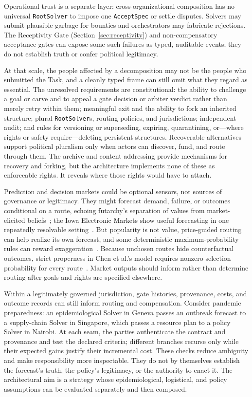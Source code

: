\documentclass[11pt]{article}
\let\oldtexttt\texttt
\renewcommand{\texttt}[1]{\oldtexttt{\small #1}}
\begin{document}
Operational trust is a separate layer: cross-organizational composition has no universal \texttt{RootSolver} to impose one \texttt{AcceptSpec} or settle disputes. Solvers may submit plausible garbage for bounties and orchestrators may fabricate rejections. The Receptivity Gate (Section~\ref{sec:receptivity}) and non-compensatory acceptance gates can expose some such failures as typed, auditable events; they do not establish truth or confer political legitimacy.

At that scale, the people affected by a decomposition may not be the people who submitted the Task, and a cleanly typed frame can still omit what they regard as essential. The unresolved requirements are constitutional: the ability to challenge a goal or carve and to appeal a gate decision or arbiter verdict rather than merely retry within them; meaningful exit and the ability to fork an inherited structure; plural \texttt{RootSolver}s, routing policies, and jurisdictions; independent audit; and rules for versioning or superseding, expiring, quarantining, or---where rights or safety require---deleting persistent structures. Recoverable alternatives support political pluralism only when actors can discover, fund, and route through them. The archive and content addressing provide mechanisms for recovery and forking, but the architecture implements none of these as enforceable rights. It reveals where those rights would have to attach.

Prediction and decision markets could be optional sensors, not sources of governance or legitimacy. They might forecast demand, failure, or outcomes conditional on a route, echoing futarchy's separation of values from market-elicited beliefs~\cite{hanson2013futarchy}; the Iowa Electronic Markets show useful forecasting in one repeatedly resolvable setting~\cite{berg2008prediction}. But popularity is not value, price-guided routing can help realize its own forecast, and some deterministic maximum-probability rules can reward exaggeration~\cite{othman2010decisionmarkets}. Because unchosen routes hide counterfactual outcomes, strict properness in Chen et al.'s model requires nonzero selection probability for every route~\cite{chen2014eliciting}. Market outputs should inform rather than determine routing after goals and rights are specified elsewhere.

Within a legitimately governed jurisdiction, gate histories, provenance, costs, and outcome records can still inform routing and compensation. Consider pandemic preparedness: an epidemiological Solver in Geneva passes an outbreak forecast to a supply-chain Solver in Singapore, which passes a resource plan to a policy Solver in Nairobi. At each seam, the parties authenticate the contract and provenance and test the declared criteria; different branches recurse only while their expected gains justify their incremental cost. These checks reduce ambiguity and make responsibility more inspectable. They do not by themselves establish the forecast's truth, the policy's legitimacy, or the authority to enact it. The architectural aim is a strategy whose epidemiological, logistical, and policy assumptions can be evaluated separately and then composed.
\end{document}
